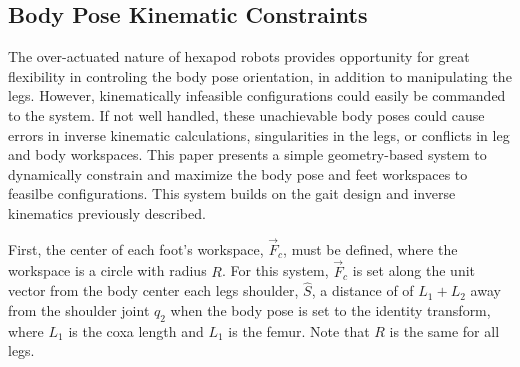 \subsection{ Body Pose Kinematic Constraints }

The over-actuated nature of hexapod robots provides opportunity for great flexibility in controling the body pose orientation, in addition to manipulating the legs. However, kinematically infeasible configurations could easily be commanded to the system. If not well handled, these unachievable body poses could cause errors in inverse kinematic calculations, singularities in the legs, or conflicts in leg and body workspaces. This paper presents a simple geometry-based system to dynamically constrain and maximize the body pose and feet workspaces to feasilbe configurations. This system builds on the gait design and inverse kinematics previously described. 

First, the center of each foot's workspace, $\vec{F}_c$, must be defined, where the workspace is a circle with radius $R$. For this system, $\vec{F}_c$ is set along the unit vector from the body center each legs shoulder, $\hat{S}$, a distance of of $L_1 + L_2$ away from the shoulder joint $q_2$ when the body pose is set to the identity transform, where $L_1$ is the coxa length and $L_1$ is the femur. Note that $R$ is the same for all legs. 

